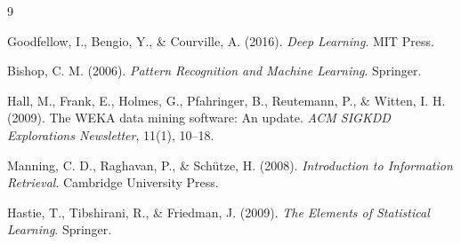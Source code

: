 \documentclass[12pt, a4paper]{article}
\begin{document}
\newpage

\begin{thebibliography}{9}

Goodfellow, I., Bengio, Y., \& Courville, A. (2016).
\textit{Deep Learning}. MIT Press.

Bishop, C. M. (2006).
\textit{Pattern Recognition and Machine Learning}. Springer.

Hall, M., Frank, E., Holmes, G., Pfahringer, B., Reutemann, P., \& Witten, I. H. (2009).
The WEKA data mining software: An update.
\textit{ACM SIGKDD Explorations Newsletter}, 11(1), 10--18.

Manning, C. D., Raghavan, P., \& Sch\"utze, H. (2008).
\textit{Introduction to Information Retrieval}. Cambridge University Press.

Hastie, T., Tibshirani, R., \& Friedman, J. (2009).
\textit{The Elements of Statistical Learning}. Springer.

\end{thebibliography}
\end{document}
